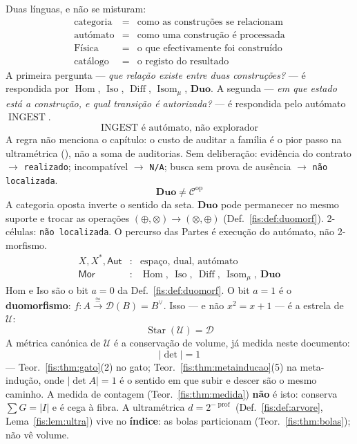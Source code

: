 \documentclass[livro.tex]{subfiles}
\begin{document}
\noindent Duas línguas, e não se misturam:
\[
\boxed{\;
\begin{array}{rcl}
\text{categoria}
& = &
\text{como as construções se relacionam}\\[3pt]
\text{autómato}
& = &
\text{como uma construção é processada}\\[3pt]
\text{Física}
& = &
\text{o que efectivamente foi construído}\\[3pt]
\text{catálogo}
& = &
\text{o registo do resultado}
\end{array}
\;}
\]
A primeira pergunta --- \emph{que relação existe entre duas
construções?} --- é respondida por
$\operatorname{Hom}$, $\operatorname{Iso}$, $\operatorname{Diff}$,
$\operatorname{Isom}_{\mu}$, $\mathbf{Duo}$.
A segunda --- \emph{em que estado está a construção, e qual transição é
autorizada?} --- é respondida pelo autómato $\operatorname{INGEST}$.
\[
\boxed{\;\operatorname{INGEST}\text{ é autómato, não explorador}\;}
\]
A regra não menciona o capítulo: o custo de auditar a família é o pior
passo na ultramétrica (), não a soma de
auditorias. Sem deliberação: evidência do contrato \(\to\)
\texttt{realizado}; incompatível \(\to\) \texttt{N/A}; busca sem prova
de ausência \(\to\) \texttt{não localizada}.
\[
\boxed{\;\mathbf{Duo}\neq\mathcal{C}^{\mathrm{op}}\;}
\]
A categoria oposta inverte o sentido da seta. $\mathbf{Duo}$ pode
permanecer no mesmo suporte e trocar as operações
$(\oplus,\otimes)\to(\otimes,\oplus)$ (Def.~\ref{fis:def:duomorf}).
2-células: \texttt{não localizada}. O percurso das Partes é execução do
autómato, não 2-morfismo.
\[
\boxed{\;
\begin{array}{rcl}
X,X^{*},\mathsf{Aut}
&:&
\text{espaço, dual, autómato}\\[4pt]
\mathsf{Mor}
&:&
\operatorname{Hom},\ \operatorname{Iso},\ \operatorname{Diff},\ \operatorname{Isom}_{\mu},\ \mathbf{Duo}
\end{array}
\;}
\]
Hom e Iso são o bit $a=0$ da Def.~\ref{fis:def:duomorf}. O bit $a=1$ é o
\textbf{duomorfismo}: $f\colon A\xrightarrow{\cong}\mathcal{D}(B)=B^{\vee}$.
Isso --- e não $x^{2}=x+1$ --- é a estrela de $\mathcal{U}$:
\[
\boxed{\;\operatorname{Star}(\mathcal{U})=\mathcal{D}\;}
\]
A métrica canónica de $\mathcal{U}$ é a conservação de volume, já
medida neste documento:
\[
\boxed{\;\lvert\det\rvert=1\;}
\]
--- Teor.~\ref{fis:thm:gato}(2) no gato; Teor.~\ref{fis:thm:metainducao}(5)
na meta-indução, onde $\lvert\det A\rvert=1$ é o sentido em que subir e
descer são o mesmo caminho. A medida de contagem
(Teor.~\ref{fis:thm:medida}) \textbf{não} é isto: conserva $\sum G=\lvert I\rvert$
e é cega à fibra. A ultramétrica $d=2^{-\operatorname{prof}}$
(Def.~\ref{fis:def:arvore}, Lema~\ref{fis:lem:ultra}) vive no
\textbf{índice}: as bolas particionam (Teor.~\ref{fis:thm:bolas}); não
vê volume.
\end{document}

